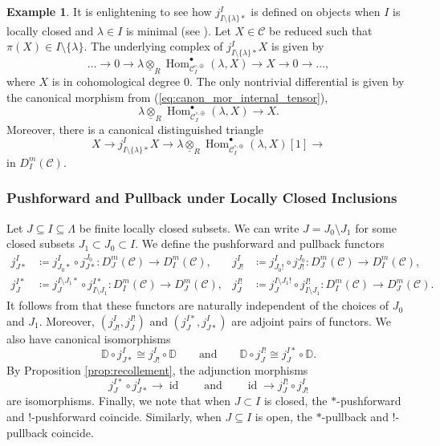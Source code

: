 \documentclass{amsart}
\newcommand{\scrC}{\mathcal{C}}
\DeclareMathOperator{\Hom}{Hom}
\newcommand{\DD}{\mathbb{D}}
\DeclareMathOperator{\id}{id}
\theoremstyle{definition}
\newtheorem{example}[subsubsection]{Example}
\numberwithin{equation}{subsection}
\begin{document}
\begin{example}\label{ex:min_rec_dts}
It is enlightening to see how $j_{I \setminus \{\lambda\} *}^I$ is defined on objects when $I$ is locally closed and $\lambda \in I$ is minimal (see \cite[\S 5.2]{ARV}).
Let $X \in \scrC$ be reduced such that $\pi (X) \in I \setminus \{\lambda\}$. The underlying complex of $j_{I \setminus \{\lambda\} *}^I X$ is given by
\[\ldots \to 0 \to \lambda \underline{\otimes}_R \Hom_{\scrC_{I}^{\circ, \oplus}}^{\bullet} (\lambda, X) \to X \to 0 \to \ldots,\]
where $X$ is in cohomological degree $0$. The only nontrivial differential is given by the canonical morphism from (\ref{eq:canon_mor_internal_tensor}),
\[\lambda \underline{\otimes}_R \Hom_{\scrC_{I}^{\circ, \oplus}}^{\bullet} (\lambda, X) \to X.\]
Moreover, there is a canonical distinguished triangle
\begin{equation}
    X \to j_{I \setminus \{\lambda\} *}^I X \to \lambda \underline{\otimes}_R \Hom_{\scrC_{I}^{\circ, \oplus}}^{\bullet} (\lambda, X) [1] \to
\end{equation}
in $D_I^m (\scrC)$. 
\end{example}

\subsubsection{Pushforward and Pullback under Locally Closed Inclusions}

Let $J \subseteq I \subseteq \Lambda$ be finite locally closed subsets.
We can write $J = J_0 \setminus J_1$ for some closed subsets $J_1 \subset J_0 \subset I$.
We define the pushforward and pullback functors
\begin{align*}
    j_{J*}^I &\coloneq j_{J_0 *}^I \circ j_{J*}^{J_0} : D_J^m (\scrC) \to D_I^m (\scrC), & j_{J!}^I &\coloneq j_{J_0 !}^I \circ j_{J!}^{J_0} : D_J^m (\scrC) \to D_I^m (\scrC), \\
j_J^{I*} &\coloneq j_J^{I \setminus J_1 *} \circ j_{I \setminus J_1}^{I*} : D_I^m (\scrC) \to D_J^m (\scrC), & j_J^{I!} &\coloneq j_J^{I \setminus J_1 !} \circ j_{I \setminus J_1}^{I!} : D_I^m (\scrC) \to D_J^m (\scrC).
\end{align*}
It follows from \cite[Lemma 5.10]{ARV} that these functors are naturally independent of the choices of $J_0$ and $J_1$.  
Moreover, $\left( j_{J!}^I, j_{J}^{I!} \right)$ and $\left( j_{J}^{I*}, j_{J*}^I\right)$ are adjoint pairs of functors.
We also have canonical isomorphisms
\begin{equation}\label{eq:verdier_duality_and_pushforwards}
    \DD \circ j_{J*}^{I} \cong j_{J!}^{I} \circ \DD \qquad\text{and}\qquad \DD \circ j_{J}^{I!} \cong j_{J}^{I*} \circ \DD.
\end{equation}
By Proposition \ref{prop:recollement}, the adjunction morphisms
\[j_{J}^{I*} \circ j_{J*}^{I} \to \id \qquad\text{and}\qquad \id \to j_{J}^{I!} \circ j_{J!}^I \]
are isomorphisms. Finally, we note that when $J \subset I$ is closed, the $*$-pushforward and $!$-pushforward coincide.
Similarly, when $J \subseteq I$ is open, the $*$-pullback and $!$-pullback coincide.
\end{document}

